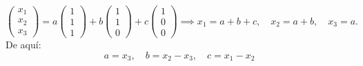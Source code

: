 \begin{prob}
\begin{myproof}
\[
\begin{pmatrix} x_1 \\ x_2 \\ x_3 \end{pmatrix} = a \begin{pmatrix} 1 \\ 1 \\ 1 \end{pmatrix} + b \begin{pmatrix} 1 \\ 1 \\ 0 \end{pmatrix} + c \begin{pmatrix} 1 \\ 0 \\ 0 \end{pmatrix}
\implies
x_1 = a + b + c,\quad x_2 = a + b,\quad x_3 = a.
\]
De aquí:
\[
a = x_3,\quad b = x_2 - x_3,\quad c = x_1 - x_2
\]


\end{myproof}
\end{prob}
